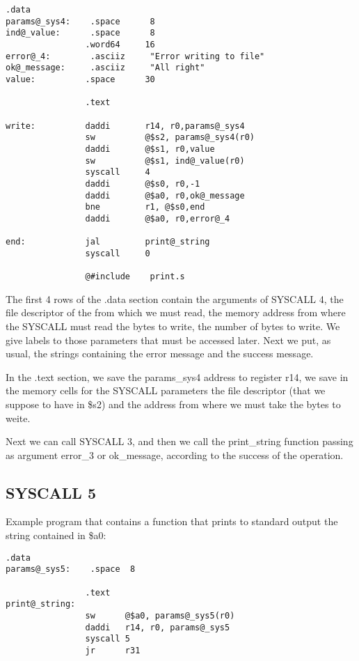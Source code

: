 \documentclass[letterpaper,10pt,english]{sphinxmanual}
\begin{document}
\begin{Verbatim}[commandchars=@\[\]]
                .data
params@_sys4:    .space      8
ind@_value:      .space      8
                .word64     16
error@_4:        .asciiz     "Error writing to file"
ok@_message:     .asciiz     "All right"
value:          .space      30

                .text

write:          daddi       r14, r0,params@_sys4
                sw          @$s2, params@_sys4(r0)
                daddi       @$s1, r0,value
                sw          @$s1, ind@_value(r0)
                syscall     4
                daddi       @$s0, r0,-1
                daddi       @$a0, r0,ok@_message
                bne         r1, @$s0,end
                daddi       @$a0, r0,error@_4

end:            jal         print@_string
                syscall     0

                @#include    print.s
\end{Verbatim}

The first 4 rows of the .data section contain the arguments of SYSCALL 4, the file
descriptor of the from which we must read, the memory address from where the SYSCALL
must read the bytes to write, the number of bytes to write. We give labels to those
parameters that must be accessed later.  Next we put, as usual, the strings
containing the error message and the success message.

In the .text section, we save the params\_sys4 address to register r14, we save
in the memory cells for the SYSCALL parameters the file descriptor (that we
suppose to have in \$s2) and the address from where we must take the bytes to
weite.

Next we can call SYSCALL 3, and then we call the print\_string function passing as
argument error\_3 or ok\_message, according to the success of the operation.


\subsection{SYSCALL 5}
\label{examples:syscall-5}
Example program that contains a function that prints to standard output the
string contained in \$a0:

\begin{Verbatim}[commandchars=@\[\]]
                .data
params@_sys5:    .space  8

                .text
print@_string:
                sw      @$a0, params@_sys5(r0)
                daddi   r14, r0, params@_sys5
                syscall 5
                jr      r31
\end{Verbatim}
\end{document}
